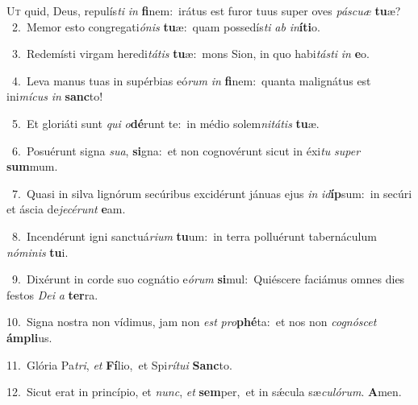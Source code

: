 \lettrine{\initial\textcolor{\initialcolor}{U}}{t} quid, Deus, repulís\textit{ti} \textit{in} \textbf{fi}\-nem:~\star irátus est furor tuus super oves \textit{pás}\-\textit{cu}\textit{æ} \textbf{tu}\-æ?\\
{\numbfont\textcolor{\numbcolor}{~2.}}~Memor esto congregati\-\textit{ó}\-\textit{nis} \textbf{tu}\-æ:~\star quam possedís\textit{ti} \textit{ab} \textit{in}\-\textbf{í}\textbf{ti}o.\par
{\numbfont\textcolor{\numbcolor}{~3.}}~Redemísti virgam heredi\-\textit{tá}\-\textit{tis} \textbf{tu}\-æ:~\star mons Sion, in quo habi\-\textit{tás}\-\textit{ti} \textit{in} \textbf{e}\-o.\par
{\numbfont\textcolor{\numbcolor}{~4.}}~Leva manus tuas in supérbias eó\textit{rum} \textit{in} \textbf{fi}\-nem:~\star quanta malignátus est ini\-\textit{mí}\-\textit{cus} \textit{in} \textbf{sanc}\-to!\par
{\numbfont\textcolor{\numbcolor}{~5.}}~Et gloriáti sunt \textit{qui} \textit{o}\-\textbf{dé}runt te:~\star in médio solem\-\textit{ni}\-\textit{tá}\textit{tis} \textbf{tu}\-æ.\par
{\numbfont\textcolor{\numbcolor}{~6.}}~Posuérunt signa \textit{su}\-\textit{a}, \textbf{si}\-gna:~\star et non cognovérunt sicut in éxi\textit{tu} \textit{su}\-\textit{per} \textbf{sum}\-mum.\par
{\numbfont\textcolor{\numbcolor}{~7.}}~Quasi in silva lignórum secúribus excidérunt jánuas ejus \textit{in} \textit{id}\-\textbf{íp}sum:~\star in secúri et áscia de\-\textit{je}\-\textit{cé}\textit{runt} \textbf{e}\-am.\par
{\numbfont\textcolor{\numbcolor}{~8.}}~Incendérunt igni sanctuá\-\textit{ri}\-\textit{um} \textbf{tu}\-um:~\star in terra polluérunt tabernáculum \textit{nó}\-\textit{mi}\textit{nis} \textbf{tu}\-i.\par
{\numbfont\textcolor{\numbcolor}{~9.}}~Dixérunt in corde suo cognátio e\-\textit{ó}\-\textit{rum} \textbf{si}\-mul:~\star Quiéscere faciámus omnes dies festos \textit{De}\-\textit{i} \textit{a} \textbf{ter}\-ra.\par
{\numbfont\textcolor{\numbcolor}{10.}}~Signa nostra non vídimus, jam non \textit{est} \textit{pro}\-\textbf{phé}ta:~\star et nos non \textit{co}\-\textit{gnó}\textit{scet} \textbf{ám}\-\textbf{pli}us.\par
{\numbfont\textcolor{\numbcolor}{11.}}~Glória Pa\-\textit{tri}\-, \textit{et} \textbf{Fí}\-lio,~\star et Spi\-\textit{rí}\-\textit{tu}\textit{i} \textbf{Sanc}\-to.\par
{\numbfont\textcolor{\numbcolor}{12.}}~Sicut erat in princípio, et \textit{nunc}\-, \textit{et} \textbf{sem}\-per,~\star et in sǽcula sæ\-\textit{cu}\-\textit{ló}\textit{rum}. \textbf{A}\-men.\par
